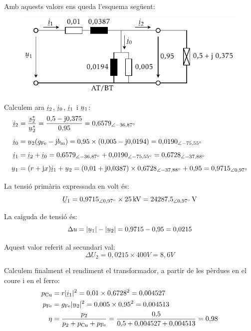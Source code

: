 \begin{exemple}
    Amb aquests valors ens queda l'esquema seg\"{u}ent:

    \begin{figure}[htb]
    \centering
        \includegraphics{Imatges/Cap-TrafosPot-Exemple-TR.pdf}
    \end{figure}

    Calculem ara $\cmplx{i}_2$, $\cmplx{i}_0$, $\cmplx{i}_1$ i $\cmplx{u}_1$:
    \begin{align*}
    \cmplx{i}_2 &= \frac{\cmplx{s}_2^*}{\cmplx{u}_2^*} = \frac{0{,}5 - \ju 0{,}375}{0{,}95} = 0{,}6579_{\angle -36{,}87\degree} \\[1ex]
    \cmplx{i}_0 &= \cmplx{u}_2 (g\ped{Fe}-\ju b\ped{m}) = 0{,}95\times(0{,}005-\ju 0{,}0194) = 0{,}0190_{\angle -75{,}55\degree} \\[1ex]
    \cmplx{i}_1 &= \cmplx{i}_2 + \cmplx{i}_0 =0{,}6579_{\angle -36{,}87\degree} +0{,}0190_{\angle -75{,}55\degree} = 0{,}6728_{\angle -37{,}88\degree} \\[1ex]
    \cmplx{u}_1 &=(r+\ju x) \cmplx{i}_1 + \cmplx{u}_2 = (0{,}01+\ju 0{,}0387) \times 0{,}6728_{\angle -37{,}88\degree} + 0{,}95 = 0{,}9715_{\angle 0{,}97\degree}
  \end{align*}

  La tensi\'{o} prim\`{a}ria expressada en volt \'{e}s:
  \[
    \cmplx{U}_1 = 0{,}9715_{\angle 0{,}97\degree}\times 25\unit{kV} = 24287{,}5_{\angle 0{,}97\degree}\unit{V}
  \]

   La caiguda de tensi\'{o} \'{e}s:
   \[
        \Delta u = |\cmplx{u}_1| - |\cmplx{u}_2| = 0{,}9715 - 0{,}95 = 0{,}0215
   \]

   Aquest valor referit al secundari val:
   \[
        \Delta U_2 = 0{,}0215\times 400\unit{V} = 8{,}6\unit{V}
   \]

   Calculem finalment el rendiment el transformador, a partir de les p\`{e}rdues en el coure  i en el ferro:
   \begin{align*}
    p\ped{Cu} &= r |\cmplx{i}_1|^2  = 0{,}01\times 0{,}6728^2 = 0{,}004527\\
    p\ped{Fe} &= g\ped{Fe} |\cmplx{u}_2|^2 = 0{,}005\times 0{,}95^2 = 0{,}004513\\
    \eta &= \frac{p_2}{p_2 + p\ped{Cu} + p\ped{Fe}} = \frac{0{,}5}{0{,}5 + 0{,}004527 + 0{,}004513 } = 0{,}98
  \end{align*}

\end{exemple}


